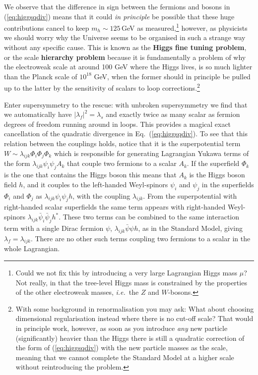 \documentclass[notes.tex]{subfiles}
\begin{document}
We observe that the difference in sign between the fermions and bosons in (\ref{eq:higgsqdiv}) means that it could {\it in principle} be possible that these huge contributions cancel to keep $m_h \sim 125$\,GeV as measured,\footnote{Could we not fix this by introducing a very large Lagrangian Higgs mass $\mu$? Not really, in that the tree-level Higgs mass is constrained by the properties of the other electroweak masses, {\it i.e.}\ the $Z$ and $W$-bosons.} however, as physicists we should worry why the Universe seems to be organised in such a strange way without any specific cause. This is known as the {\bf Higgs fine tuning problem}, or the scale {\bf hierarchy problem} because it is fundamentally a problem of why the electroweak scale at around 100 GeV where the Higgs lives, is so much lighter than the Planck scale of $10^{18}$ GeV, when the former should in principle be pulled up to the latter by the sensitivity of scalars to loop corrections.\footnote{With some background in renormalisation you may ask: What about choosing dimensional regularisation instead where there is no cut-off scale? That would in principle work, however, as soon as you introduce {\it any} new particle (significantly) heavier than the Higgs there is still a quadratic correction of the form of (\ref{eq:higgsqdiv}) with the new particle masses as the scale, meaning that we cannot complete the Standard Model at a higher scale without reintroducing the problem.}

Enter supersymmetry to the rescue: with unbroken supersymmetry we find that we automatically have $|\lambda_f|^2 = \lambda_s$ and exactly twice as many scalar as fermion degrees of freedom running around in loops. This provides a magical exact cancellation of the quadratic divergence in Eq.~(\ref{eq:higgsqdiv}). To see that this relation between the couplings holds, notice that it is the superpotential term $W \sim \lambda_{ijk}\Phi_i\Phi_j \Phi_k$ which is responsible for generating Lagrangian Yukawa terms of the form $\lambda_{ijk} \psi_i\psi_j A_k$ that couple two fermions to a scalar $A_k$. If the superfield $\Phi_k$ is the one that contains the Higgs boson this means that $A_k$ is the Higgs boson field $h$, and it couples to the left-handed Weyl-spinors $\psi_i$ and $\psi_j$  in the superfields $\Phi_i$ and $\Phi_j$  as $\lambda_{ijk}\psi_i\psi_j h$, with the coupling $\lambda_{ijk}$. From the superpotential with right-handed scalar superfields the same term appears with right-handed Weyl-spinors $\lambda_{ijk}\bar\psi_i\bar\psi_j h^*$. These two terms can be combined to the same interaction term with a single Dirac fermion $\psi$,  $\lambda_{ijk}\bar\psi\psi h$, as in the Standard Model, giving $\lambda_f = \lambda_{ijk}$. There are no other such terms coupling two fermions to a scalar in the whole Lagrangian.
\end{document}
